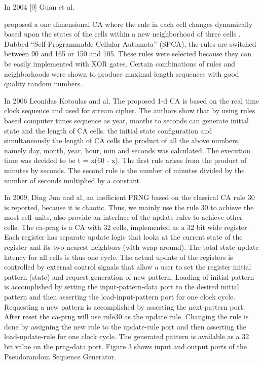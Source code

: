 %

In 2004 [9] Guan et al. 

proposed a one dimensional CA where the rule in each cell changes dynamically based upon the states of the cells within a new neighborhood of three cells . Dubbed “Self-Programmable Cellular Automata” (SPCA), the rules are switched between 90 and 165 or 150 and 105. These rules were selected because they can be easily implemented with XOR gates. Certain combinations of rules and neighborhoods were shown to produce maximal length sequences with good quality random numbers.

In 2006 Leonidas Kotoulas and al, The proposed 1-d CA is based on the real time clock sequence and used for stream cipher. The authors show that by using rules based computer times sequence as year, months to seconds can generate initial state and the length of CA cells. the initial state configuration and simultaneously the length of CA cells the product of all the above numbers, namely day, month, year, hour, min and seconds was calculated. The execution time was decided to be t = x(60 - x). The first rule arises from the product of minutes by seconds. The second rule is the number of minutes divided by the number of seconds multiplied by a constant.

In 2009, Ding Jun and al, 
an inefficient PRNG based on the classical CA rule 30 is reported, because it is chaotic. Thus, we mainly use the rule 30 to achieve the most cell units, also provide an interface of the update rules to achieve other cells.
The ca-prng is a CA with 32 cells, implemented as a 32 bit wide register. Each register has separate update logic that looks at the current state of the register and its two nearest neighbors (with wrap around). The total state update latency for all cells is thus one cycle. The actual update of the registers is controlled by external control signals that allow a user to set the register initial pattern (state) and request generation of new pattern. Loading of initial pattern is accomplished by setting the input-pattern-data port to the desired initial pattern and then asserting the load-input-pattern port for one clock cycle. Requesting a new pattern is accomplished by asserting the next-pattern port. After reset the ca-prng will use rule30 as the update rule. Changing the rule is done by assigning the new rule to the update-rule port and then asserting the load-update-rule for one clock cycle. The generated pattern is available as a 32 bit value on the prng-data port. Figure 3 shows input and output ports of the Pseudorandom Sequence Generator.

